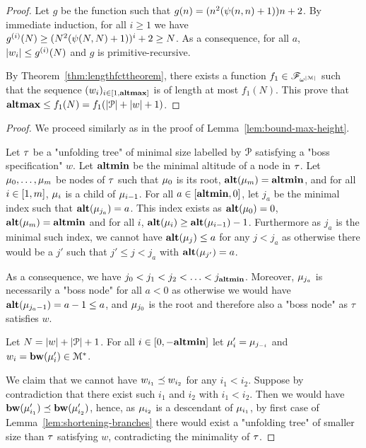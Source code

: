 \begin{proof}
	Let $g$ be the function such that $g(n) = (n^2(\psi(n,n)+1)) n +2$. By immediate induction, for all $i\geq 1$ we have $g^{(i)}(N) \geq (N^2(\psi(N,N)+1))^{i} +2 \geq N$. As a consequence, for all $a$, $|w_i| \leq g^{(i)}(N)$ and $g$ is primitive-recursive.
	
	By Theorem~\ref{thm:lengthfcttheorem}, there exists a function $f_1 \in \mathscr{F}_{\omega^{|\mathcal{M}|}}$ such that the sequence $(w_i)_{i \in [1,\mathbf{altmax}]}$ is of length at most $f_1(N)$. This prove that $\mathbf{altmax} \leq f_1(N) = f_1(|\mathcal{P}| + |w| + 1)$.
\end{proof}

\lemBoundMinHeight*

\begin{proof}
	We proceed similarly as in the proof of Lemma~\ref{lem:bound-max-height}.
	
	Let $\tau$ be a "unfolding tree" of minimal size labelled by $\mathcal{P}$ satisfying a "boss specification" $w$. Let $\mathbf{altmin}$ be the minimal altitude of a node in $\tau$. Let $\mu_0, \ldots, \mu_m$ be nodes of $\tau$ such that $\mu_0$ is its root, $\mathbf{alt}(\mu_m) = \mathbf{altmin}$, and for all $i\in [1,m]$, $\mu_i$ is a child of $\mu_{i-1}$.
	For all $a \in [\mathbf{altmin},0]$, let $j_a$ be the minimal index such that $\mathbf{alt}(\mu_{j_a}) = a$. This index exists as $\mathbf{alt}(\mu_0) = 0$, $\mathbf{alt}(\mu_m) = \mathbf{altmin}$ and for all $i$, $\mathbf{alt}(\mu_{i}) \geq \mathbf{alt}(\mu_{i-1})-1$.
	Furthermore as $j_a$ is the minimal such index, we cannot have $\mathbf{alt}(\mu_j) \leq a$ for any $j < j_a$ as otherwise there would be a $j'$ such that $j' \leq j < j_a$ with $\mathbf{alt}(\mu_{j'}) = a$.
	
	As a consequence, we have $j_0 < j_1 < j_2 < \ldots < j_{\mathbf{altmin}}$. Moreover, $\mu_{j_a}$ is necessarily a "boss node" for all $a<0$ as otherwise we would have $\mathbf{alt}(\mu_{j_a-1}) = a-1 \leq a$, and $\mu_{j_0}$ is the root and therefore also a "boss node" as $\tau$ satisfies $w$.
	
	Let $N = |w| + |\mathcal{P}|+1$. For all $i \in [0,-\mathbf{altmin}]$ let $\mu'_i = \mu_{j_{-i}}$ and $w_i = \mathbf{bw}(\mu'_{i}) \in \mathcal{M}^*$.
	
	We claim that we cannot have $w_{i_1}\preceq w_{i_2}$ for any  $i_1< i_2$.
	Suppose by contradiction that there exist such $i_1$ and $i_2$ with $i_1 < i_2$. Then we would have $\mathbf{bw}(\mu'_{i_1}) \preceq \mathbf{bw}(\mu'_{i_2})$, hence, as $\mu_{i_2}$ is a descendant of $\mu_{i_1}$, by first case of Lemma~\ref{lem:shortening-branches} there would exist a "unfolding tree" of smaller size than $\tau$ satisfying $w$, contradicting the minimality of $\tau$.
	

\end{proof}
